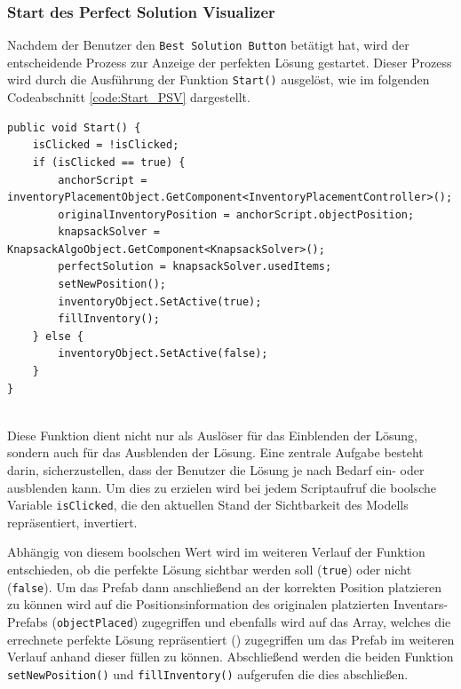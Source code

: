 \begin{itemize}
\subsubsection{Start des Perfect Solution Visualizer}
Nachdem der Benutzer den \texttt{Best Solution Button} betätigt hat, wird der entscheidende Prozess zur Anzeige der perfekten
Lösung gestartet. Dieser Prozess wird durch die Ausführung der Funktion \texttt{Start()} ausgelöst, wie im folgenden
Codeabschnitt \ref{code:Start_PSV} dargestellt.
\begin{lstlisting}[style=csharp, caption={PerfectSolutionVisualizer Start}, label=code:Start_PSV]
public void Start() {
    isClicked = !isClicked;
    if (isClicked == true) {
        anchorScript = inventoryPlacementObject.GetComponent<InventoryPlacementController>();
        originalInventoryPosition = anchorScript.objectPosition;
        knapsackSolver = KnapsackAlgoObject.GetComponent<KnapsackSolver>();
        perfectSolution = knapsackSolver.usedItems;
        setNewPosition();
        inventoryObject.SetActive(true);
        fillInventory();
    } else {
        inventoryObject.SetActive(false);
    }
}
\end{lstlisting}\\
Diese Funktion dient nicht nur als Auslöser für das Einblenden der Lösung, sondern auch für das Ausblenden der Lösung.
Eine zentrale Aufgabe besteht darin, sicherzustellen, dass der Benutzer die Lösung je nach Bedarf ein- oder ausblenden
kann. Um dies zu erzielen wird bei jedem Scriptaufruf die boolsche Variable \texttt{isClicked}, die den aktuellen Stand
der Sichtbarkeit des Modells repräsentiert, invertiert.

Abhängig von diesem boolschen Wert wird im weiteren Verlauf der Funktion entschieden, ob die perfekte Lösung sichtbar
werden soll (\texttt{true}) oder nicht (\texttt{false}). Um das Prefab dann anschließend an der korrekten Position platzieren
zu können wird auf die Positionsinformation des originalen platzierten Inventars-Prefabs (\texttt{objectPlaced}) zugegriffen
und ebenfalls wird auf das Array, welches die errechnete perfekte Lösung repräsentiert () zugegriffen
um das Prefab im weiteren Verlauf anhand dieser füllen zu können. Abschließend werden die beiden Funktion \texttt{setNewPosition()}
und \texttt{fillInventory()} aufgerufen die dies abschließen.


\end{itemize}
